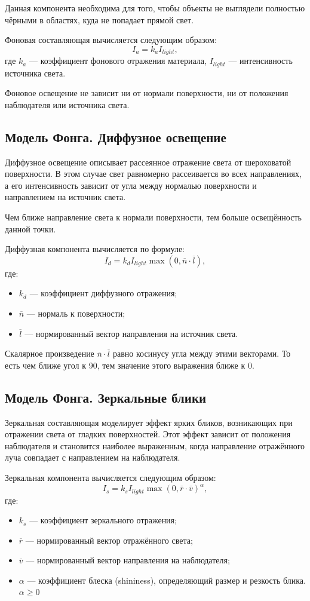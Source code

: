 \documentclass[a4paper, 12pt]{article}
\begin{document}
Данная компонента необходима для того, чтобы объекты не выглядели полностью чёрными в областях, куда не попадает прямой свет.

Фоновая составляющая вычисляется следующим образом:
\[
I_a = k_a I_{light},
\]
где $k_a$ — коэффициент фонового отражения материала, $I_{light}$ — интенсивность источника света.

Фоновое освещение не зависит ни от нормали поверхности, ни от положения наблюдателя или источника света.

\subsection{Модель Фонга. Диффузное освещение}

Диффузное освещение описывает рассеянное отражение света от шероховатой поверхности. В этом случае свет равномерно рассеивается во всех направлениях, а его интенсивность зависит от угла между нормалью поверхности и направлением на источник света.

Чем ближе направление света к нормали поверхности, тем больше освещённость данной точки.

Диффузная компонента вычисляется по формуле:
\[
I_d = k_d I_{light} \max(0, \overline{n} \cdot \overline{l}),
\]
где:
\begin{itemize}
	\item $k_d$ — коэффициент диффузного отражения;
	\item $\overline{n}$ — нормаль к поверхности;
	\item $\overline{l}$ — нормированный вектор направления на источник света.
\end{itemize}

Скалярное произведение $\overline{n} \cdot \overline{l}$ равно косинусу угла между этими векторами. То есть чем ближе угол к 90, тем значение этого выражения ближе к $0$.

\subsection{Модель Фонга. Зеркальные блики}

Зеркальная составляющая моделирует эффект ярких бликов, возникающих при отражении света от гладких поверхностей. Этот эффект зависит от положения наблюдателя и становится наиболее выраженным, когда направление отражённого луча совпадает с направлением на наблюдателя.

Зеркальная компонента вычисляется следующим образом:
\[
I_s = k_s I_{light} \max(0, \overline{r} \cdot \overline{v})^{\alpha},
\]
где:
\begin{itemize}
	\item $k_s$ — коэффициент зеркального отражения;
	\item $\overline{r}$ — нормированный вектор отражённого света;
	\item $\overline{v}$ — нормированный вектор направления на наблюдателя;
	\item $\alpha$ — коэффициент блеска (shininess), определяющий размер и резкость блика. $\alpha \geq 0$
\end{itemize}
\end{document}
